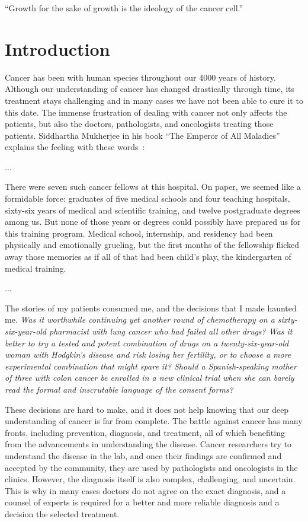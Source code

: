 
\begin{savequote}[.5\linewidth]
  ``Growth for the sake of growth is the ideology of the cancer cell.''
\end{savequote}
\chapter{Introduction}
\label{ch:intro}
Cancer has been with human species throughout our 4000 years of history.
Although our understanding of cancer has changed drastically through time, its
treatment stays challenging and in many cases we have not been able to cure it
to this date. The immense frustration of dealing with cancer not only affects
the patients, but also the doctors, pathologists, and oncologists treating those
patients. Siddhartha Mukherjee in his book ``The Emperor of All Maladies''
explains the feeling with these
words~\cite[prologue]{the-emperor-of-all-maladies}:

\begin{displayquote}
  ...
  
  There were seven such cancer fellows at this hospital. On paper, we seemed
  like a formidable force: graduates of five medical schools and four teaching
  hospitals, sixty-six years of medical and scientific training, and twelve
  postgraduate degrees among us. But none of those years or degrees could
  possibly have prepared us for this training program. Medical school,
  internship, and residency had been physically and emotionally grueling, but
  the first months of the fellowship flicked away those memories as if all of
  that had been child's play, the kindergarten of medical training.

  ...

  The stories of my patients consumed me, and the decisions that I made haunted
  me. \emph{Was it worthwhile continuing yet another round of chemotherapy on a
    sixty-six-year-old pharmacist with lung cancer who had failed all other
    drugs? Was it better to try a tested and potent combination of drugs on a
    twenty-six-year-old woman with Hodgkin's disease and risk losing her
    fertility, or to choose a more experimental combination that might spare it?
    Should a Spanish-speaking mother of three with colon cancer be enrolled in a
    new clinical trial when she can barely read the formal and inscrutable
    language of the consent forms?}
\end{displayquote}

These decisions are hard to make, and it does not help knowing that our deep
understanding of cancer is far from complete. The battle against cancer has many
fronts, including prevention, diagnosis, and treatment, all of which benefiting
from the advancements in understanding the disease. Cancer researchers try to
understand the disease in the lab, and once their findings are confirmed and
accepted by the community, they are used by pathologists and oncologists in the
clinics. However, the diagnosis itself is also complex, challenging, and
uncertain. This is why in many cases doctors do not agree on the exact
diagnosis, and a counsel of experts is required for a better and more reliable
diagnosis and a decision the selected treatment.

